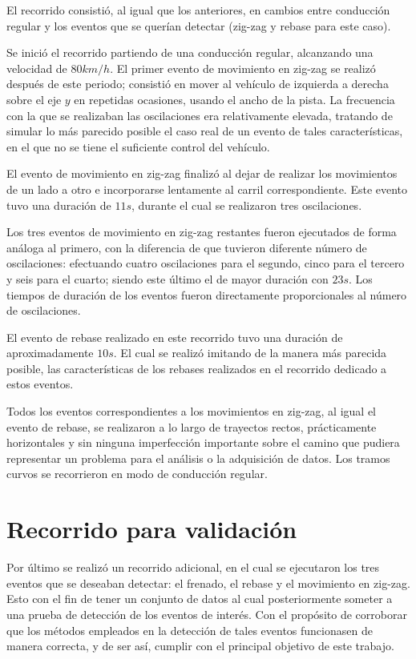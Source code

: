 El recorrido consistió, al igual que los anteriores, en cambios entre conducción regular y los eventos que se querían detectar (zig-zag y rebase para este caso). 

Se inició el recorrido partiendo de una conducción regular, alcanzando una velocidad de $80km/h$.
El primer evento de movimiento en zig-zag se realizó después de este periodo; consistió en mover al vehículo de izquierda a derecha sobre el eje $y$ en repetidas ocasiones, usando el ancho de la pista. 
La frecuencia con la que se realizaban las oscilaciones era relativamente elevada, tratando de simular lo más parecido posible el caso real de un evento de tales características, en el que no se tiene el suficiente control del vehículo.

El evento de movimiento en zig-zag finalizó al dejar de realizar los movimientos de un lado a otro e incorporarse lentamente al carril correspondiente. 
Este evento tuvo una duración de $11s$, durante el cual se realizaron tres oscilaciones.

Los tres eventos de movimiento en zig-zag restantes fueron ejecutados de forma análoga al primero, con la diferencia de que tuvieron diferente número de oscilaciones: efectuando cuatro oscilaciones para el segundo, cinco para el tercero y seis para el cuarto; siendo este último el de mayor duración con $23s$.
Los tiempos de duración de los eventos fueron directamente proporcionales al número de oscilaciones.

El evento de rebase realizado en este recorrido tuvo una duración de aproximadamente $10s$. 
El cual se realizó imitando de la manera más parecida posible, las características de los rebases realizados en el recorrido dedicado a estos eventos.

Todos los eventos correspondientes a los movimientos en zig-zag, al igual el evento de rebase, se realizaron a lo largo de trayectos rectos, prácticamente horizontales y sin ninguna imperfección importante sobre el camino que pudiera representar un problema para el análisis o la adquisición de datos. 
Los tramos curvos se recorrieron en modo de conducción regular.

\section{Recorrido para validación}

Por último se realizó un recorrido adicional, en el cual se ejecutaron los tres eventos que se deseaban detectar: el frenado, el rebase y el movimiento en zig-zag. 
Esto con el fin de tener un conjunto de datos al cual posteriormente someter a una prueba de detección de los eventos de interés. 
Con el propósito de corroborar que los métodos empleados en la detección de tales eventos funcionasen de manera correcta, y de ser así, cumplir con el principal objetivo de este trabajo.

